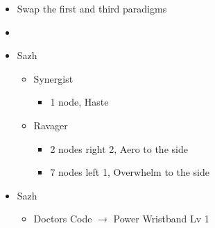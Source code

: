 \begin{menu}
\begin{multicols}{2}
\begin{itemize}
    \paradigm
    \begin{itemize}
        \item Swap the first and third paradigms
        \item {}%
{\paradigmline[1]{\textit{\syn}}{\textit{\sab}}{}}%
{\paradigmline{\com}{\med}{}}%
{\paradigmline{\com}{\rav}{}}%
{\paradigmline{\rav}{\rav}{}}%
{\paradigmline{[\rav]}{(\sab)}{}}%
{\paradigmline{[\com]}{(\sab)}{}}
    \end{itemize}
    \columnbreak
    \crystarium
    \begin{itemize}
        \item Sazh
        \begin{itemize}
            \item Synergist
            \begin{itemize}
                \item 1 node, Haste
            \end{itemize}
            \item Ravager
            \begin{itemize}
                \item 2 nodes right 2, Aero to the side
                \item 7 nodes left 1, Overwhelm to the side
            \end{itemize}
        \end{itemize}
    \end{itemize}
    \equip
    \begin{itemize}
        \item Sazh
        \begin{itemize}
                \item Doctors Code $\rightarrow$ Power Wristband Lv 1
        \end{itemize}
    \end{itemize}
\end{itemize}
\end{multicols}
\end{menu}

\renewcommand{\first}{[1] Tide Turner (\syn/\sab)}
\renewcommand{\second}{[2] War and Peace (\com/\med)}
\renewcommand{\third}{[3] Slash \& Burn (\com/\rav)}
\renewcommand{\fourth}{[4] Dualcasting (\rav/\rav)}
\renewcommand{\fifth}{[5] Undermine (\rav/\sab)}
\renewcommand{\sixth}{[6] Divide \& Conquer (\com/\sab)}

